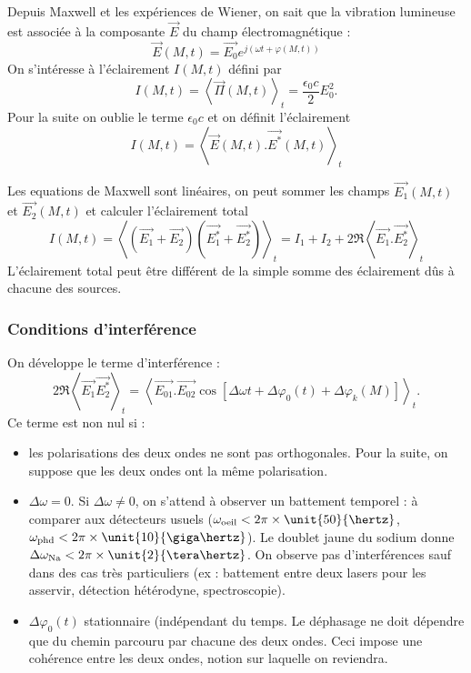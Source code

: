 Depuis Maxwell et les expériences de Wiener, on sait que la vibration lumineuse est associée à la composante $\overrightarrow{E}$ du champ électromagnétique :
\begin{equation}
\overrightarrow{E}(M,t) = \overrightarrow{E_0}e^{j(\omega t +\varphi(M,t))}
\end{equation}
On s'intéresse à l'éclairement $I(M,t)$ défini par
\begin{equation}
I(M,t) = \left< \overrightarrow{\Pi}(M,t)\right>_t = \frac{\epsilon_0 c}{2}E_0^2.
\end{equation}
Pour la suite on oublie le terme $\epsilon_0 c$ et on définit l'éclairement
\begin{equation}
I(M,t) = \left< \overrightarrow{E}(M,t).\overrightarrow{E^*}(M,t)\right>_t
\end{equation}

Les equations de Maxwell sont linéaires, on peut sommer les champs $\overrightarrow{E_1}(M,t)$ et $\overrightarrow{E_2}(M,t)$ et calculer l'éclairement total
\begin{equation}
I(M,t) = \left< (\overrightarrow{E_1} + \overrightarrow{E_2})(\overrightarrow{E_1^*} + \overrightarrow{E_2^*}) \right>_t = I_1 + I_2 + 2\Re\left< \overrightarrow{E_1}.\overrightarrow{E_2^*} \right>_t 
\end{equation}
L'éclairement total peut être différent de la simple somme des éclairement dûs à chacune des sources.

\subsubsection{Conditions d'interférence}

On développe le terme d'interférence :
\begin{equation}
2\Re \left< \overrightarrow{E_1} \overrightarrow{E_2^*} \right>_t =
\left<
\overrightarrow{E_{01}}.\overrightarrow{E_{02}}
\cos\left[ \Delta \omega t + \Delta \varphi_0(t) + \Delta\varphi_k(M)\right]
\right>_t.
\end{equation}
Ce terme est non nul si :
\begin{itemize}
\item les polarisations des deux ondes ne sont pas orthogonales.
Pour la suite, on suppose que les deux ondes ont la même polarisation.
\item  $\Delta\omega = 0$.
Si $\Delta\omega \neq 0$, on s'attend à observer un battement temporel : à comparer aux détecteurs usuels ($\omega_\mathrm{oeil} < 2\pi\times\unit{50}{\hertz}$, $\omega_\mathrm{phd} < 2\pi\times\unit{10}{\giga\hertz}$).
Le doublet jaune du sodium donne $\Delta\omega_\mathrm{Na} < 2\pi\times\unit{2}{\tera\hertz}$.
On observe pas d'interférences sauf dans des cas très particuliers (ex : battement entre deux lasers pour les asservir, détection hétérodyne, spectroscopie).
\item $\Delta\varphi_0(t)$ stationnaire (indépendant du temps.
Le déphasage ne doit dépendre que du chemin parcouru par chacune des deux ondes.
Ceci impose une cohérence entre les deux ondes, notion sur laquelle on reviendra.
\end{itemize}

